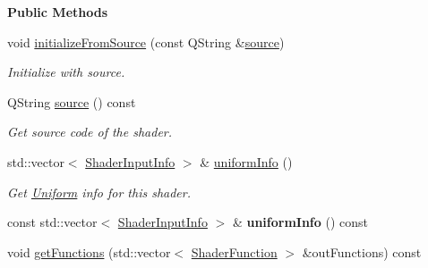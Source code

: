 \begin{Indent}\textbf{ Public Methods}\par
\begin{DoxyCompactItemize}
\item 
\mbox{\label{classrev_1_1_shader_a4fd089507471cf5552d967f3e6a21604}} 
void \mbox{\hyperlink{classrev_1_1_shader_a4fd089507471cf5552d967f3e6a21604}{initialize\+From\+Source}} (const Q\+String \&\mbox{\hyperlink{classrev_1_1_shader_a4bd49f884aa74543c68d235f0c14ee71}{source}})
\begin{DoxyCompactList}\small\item\em Initialize with source. \end{DoxyCompactList}\item 
\mbox{\label{classrev_1_1_shader_a4bd49f884aa74543c68d235f0c14ee71}} 
Q\+String \mbox{\hyperlink{classrev_1_1_shader_a4bd49f884aa74543c68d235f0c14ee71}{source}} () const
\begin{DoxyCompactList}\small\item\em Get source code of the shader. \end{DoxyCompactList}\item 
\mbox{\label{classrev_1_1_shader_aac3875c1eee0221c95f240459eddb7ad}} 
std\+::vector$<$ \mbox{\hyperlink{structrev_1_1_shader_input_info}{Shader\+Input\+Info}} $>$ \& \mbox{\hyperlink{classrev_1_1_shader_aac3875c1eee0221c95f240459eddb7ad}{uniform\+Info}} ()
\begin{DoxyCompactList}\small\item\em Get \mbox{\hyperlink{structrev_1_1_uniform}{Uniform}} info for this shader. \end{DoxyCompactList}\item 
\mbox{\label{classrev_1_1_shader_af0e0a4427e86b270e99ef5e434df90ab}} 
const std\+::vector$<$ \mbox{\hyperlink{structrev_1_1_shader_input_info}{Shader\+Input\+Info}} $>$ \& {\bfseries uniform\+Info} () const
\item 
\mbox{\label{classrev_1_1_shader_a807d45250cf81be59354ddd2e0516110}} 
void \mbox{\hyperlink{classrev_1_1_shader_a807d45250cf81be59354ddd2e0516110}{get\+Functions}} (std\+::vector$<$ \mbox{\hyperlink{structrev_1_1_shader_function}{Shader\+Function}} $>$ \&out\+Functions) const

\end{DoxyCompactItemize}
\end{Indent}
